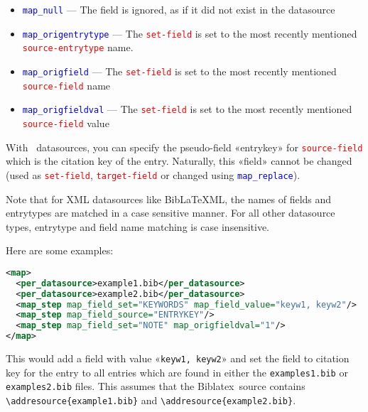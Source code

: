 \documentclass{ltxdockit}
\newcommand*{\biblatex}{Biblatex\xspace}
\begin{document}
\begin{itemize}
\begin{itemize}
    \item \textcolor{blue}{\texttt{map\_null}} --- The field is ignored, as
      if it did not exist in the datasource
    \item \textcolor{blue}{\texttt{map\_origentrytype}} --- The
      \textcolor{red}{\texttt{set-field}} is set to the
      most recently mentioned \textcolor{red}{\texttt{source-entrytype}} name.
    \item \textcolor{blue}{\texttt{map\_origfield}} --- The
      \textcolor{red}{\texttt{set-field}} is set to the most recently
      mentioned \textcolor{red}{\texttt{source-field}} name
    \item \textcolor{blue}{\texttt{map\_origfieldval}} --- The
      \textcolor{red}{\texttt{set-field}} is set to the most recently
      mentioned \textcolor{red}{\texttt{source-field}} value
  \end{itemize}
\end{itemize}

\noindent With \bibtex\ datasources, you can specify the
pseudo-field «entrykey» for \textcolor{red}{\texttt{source-field}}
which is the citation key of the entry. Naturally, this «field» cannot
be changed (used as \textcolor{red}{\texttt{set-field}},
\textcolor{red}{\texttt{target-field}} or changed using
\textcolor{blue}{\texttt{map\_replace}}).

Note that for XML datasources like BibLaTeXML, the names of
fields and entrytypes are matched in a case sensitive manner. For all other
datasource types, entrytype and field name matching is
case insensitive.

\noindent Here are some examples:

\begin{lstlisting}[language=xml,escapechar=+,mathescape=true]
<map>
  <per_datasource>example1.bib</per_datasource>
  <per_datasource>example2.bib</per_datasource>
  <map_step map_field_set="KEYWORDS" map_field_value="keyw1, keyw2"/>
  <map_step map_field_source="ENTRYKEY"/>
  <map_step map_field_set="NOTE" map_origfieldval="1"/>
</map>
\end{lstlisting}

\noindent This would add a  field with value «\verb+keyw1, keyw2+»
and set the  field to citation key for the entry
to all entries which are found in either the
\verb+examples1.bib+ or \verb+examples2.bib+ files. This assumes that the
\biblatex\ source contains \verb+\addresource{example1.bib}+ and
\verb+\addresource{example2.bib}+.
\end{document}
